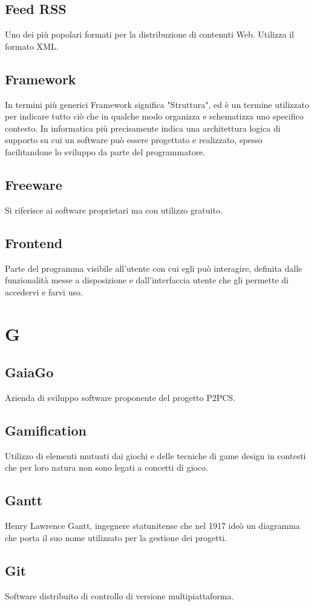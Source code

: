 \subsection*{Feed RSS} Uno dei più popolari formati per la distribuzione di contenuti Web. Utilizza il formato XML.
\subsection*{Framework} In termini più generici Framework significa "Struttura", ed è un termine utilizzato per indicare tutto ciò che in qualche modo organizza e schematizza uno specifico contesto. In informatica più precisamente indica una architettura logica di supporto su cui un software può essere progettato e realizzato, spesso facilitandone lo sviluppo da parte del programmatore.
\subsection*{Freeware} Si riferisce ai software proprietari ma con utilizzo gratuito.
\subsection*{Frontend} Parte del programma visibile all'utente con cui egli può interagire, definita dalle funzionalità messe a disposizione e dall'interfaccia utente che gli permette di accedervi e farvi uso.
\newpage
\section{G}
\subsection*{GaiaGo} Azienda di sviluppo software proponente del progetto P2PCS.
\subsection*{Gamification} Utilizzo di elementi mutuati dai giochi e delle tecniche di game design in contesti che per loro natura non sono legati a concetti di gioco.
\subsection*{Gantt} Henry Lawrence Gantt, ingegnere statunitense che nel 1917 ideò un diagramma che porta il suo nome utilizzato per la gestione dei progetti.
\subsection*{Git} Software distribuito di controllo di versione multipiattaforma.
